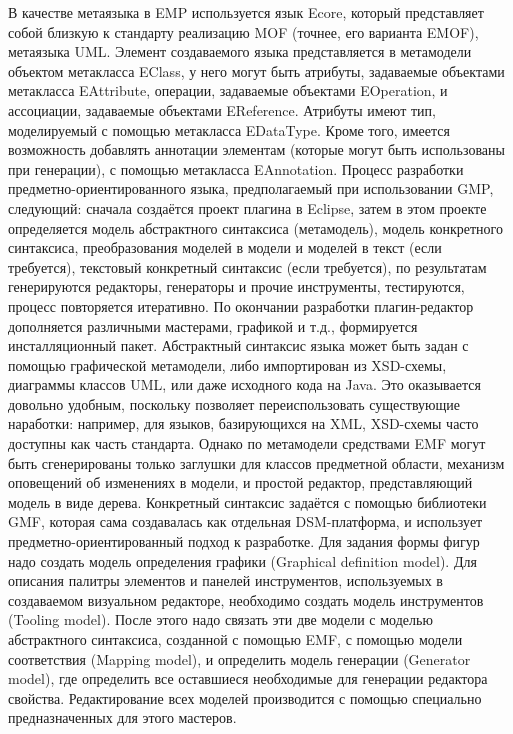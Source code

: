 	В качестве метаязыка в EMP используется язык Ecore, который представляет собой близкую к стандарту реализацию MOF (точнее, его варианта EMOF), метаязыка UML. Элемент создаваемого языка представляется в метамодели объектом метакласса EClass, у него могут быть атрибуты, задаваемые объектами метакласса EAttribute, операции, задаваемые объектами EOperation, и ассоциации, задаваемые объектами EReference. Атрибуты имеют тип, моделируемый с помощью метакласса EDataType. Кроме того, имеется возможность добавлять аннотации элементам (которые могут быть использованы при генерации), с помощью метакласса EAnnotation.
	Процесс разработки предметно-ориентированного языка, предполагаемый при использовании GMP, следующий: сначала создаётся проект плагина в Eclipse, затем в этом проекте определяется модель абстрактного синтаксиса (метамодель), модель конкретного синтаксиса, преобразования моделей в модели и моделей в текст (если требуется), текстовый конкретный синтаксис (если требуется), по результатам генерируются редакторы, генераторы и прочие инструменты, тестируются, процесс повторяется итеративно. По окончании разработки плагин-редактор дополняется различными мастерами, графикой и т.д., формируется инсталляционный пакет.
Абстрактный синтаксис языка может быть задан с помощью графической метамодели, либо импортирован из XSD-схемы, диаграммы классов UML, или даже исходного кода на Java. Это оказывается довольно удобным, поскольку позволяет переиспользовать существующие наработки: например, для языков, базирующихся на XML, XSD-схемы часто доступны как часть стандарта. Однако по метамодели средствами EMF могут быть сгенерированы только заглушки для классов предметной области, механизм оповещений об изменениях в модели, и простой редактор, представляющий модель в виде дерева. Конкретный синтаксис задаётся с помощью библиотеки GMF, которая сама создавалась как отдельная DSM-платформа, и использует предметно-ориентированный подход к разработке. Для задания формы фигур надо создать модель определения графики (Graphical definition model). Для описания палитры элементов и панелей инструментов, используемых в создаваемом визуальном редакторе, необходимо создать модель инструментов (Tooling model). После этого надо связать эти две модели с моделью абстрактного синтаксиса, созданной с помощью EMF, с помощью модели соответствия (Mapping model), и определить модель генерации (Generator model), где определить все оставшиеся необходимые для генерации редактора свойства. Редактирование всех моделей производится с помощью специально предназначенных для этого мастеров.
